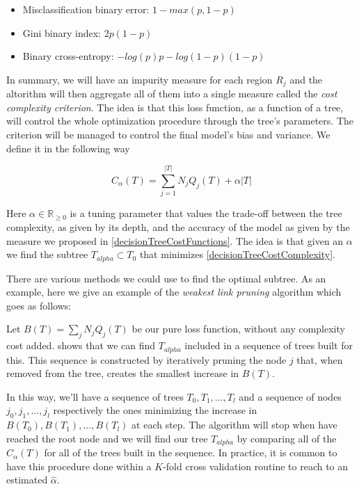 \begin{itemize}
\item Misclassification binary error: $1 - max(p, 1-p)$
\item Gini binary index: $ 2p(1-p) $
\item Binary cross-entropy: $ -log(p)p - log(1- p)(1-p) $
\end{itemize}\label{decisionTreeCostFunctions}

In summary, we will have an impurity measure for each region $R_j$ and the altorithm will then aggregate all of them into a single measure called the \textit{cost complexity criterion}. The idea is that this loss function, as a function of a tree, will control the whole optimization procedure through the tree's parameters. The criterion will be managed to control the final model's bias and variance. We define it in the following way

\begin{equation}
C_\alpha(T)  = \sum_{j=1}^{|T|} N_j Q_j(T)  + \alpha|T|
\end{equation}\label{decisionTreeCostComplexity}


Here  $\alpha \in \mathbb{R}_{\geq 0}$ is a tuning parameter that values the trade-off between the tree complexity, as given by its depth, and the accuracy of the model as given by the measure we proposed in \ref{decisionTreeCostFunctions}. The idea is that given an $\alpha$ we find the subtree $T_{alpha} \subset T_0$ that minimizes \ref{decisionTreeCostComplexity}.

There are various methods we could use to find the optimal subtree. As an example, here we give an example of the \textit{weakest link pruning} algorithm which goes as follows:

Let  $B(T)  = \sum_{j} N_j Q_j(T) $ be our pure loss function, without any complexity cost added. \textcite{breiman-cart84} shows that we can find $T_{alpha}$ included in a sequence of trees built for this. This sequence is constructed by iteratively pruning the node $j$ that, when removed from the tree, creates the smallest increase in $B(T)$.

In this way, we'll have a sequence of trees $T_0,T_1,...,T_l$ and a sequence of nodes $j_0, j_1,...,j_l$ respectively the ones minimizing the increase in $B(T_0),B(T_1),...,B(T_l)$ at each step. The algorithm will stop when have reached the root node and we will find our tree $T_{alpha}$ by comparing all of the $C_\alpha(T)$ for all of the trees built in the sequence. In practice, it is common to have this procedure done within a $K$-fold cross validation routine to reach to an estimated $\hat{\alpha}$.

